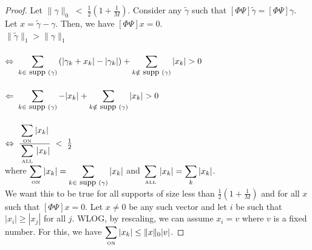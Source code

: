 \documentclass[12pt]{report}
\begin{document}
\begin{proof}
Let $\|\gamma\|_0 \; < \; \frac{1}{2}(1+\frac{1}{M})$. Consider any
$\widetilde{\gamma}$ such that $\left[ \Phi \Psi \right] \widetilde{\gamma} = \left[ \Phi \Psi \right] \gamma$.
Let $x = \widetilde{\gamma} - \gamma$. Then, we have $\left[ \Phi \Psi \right] x = 0$.\\

$\|\widetilde{\gamma}\|_1 > \|\gamma\|_1$ \\ \\
$\Leftrightarrow \; \displaystyle\sum_{k \in \mbox{\begin{small} supp \end{small}}(\gamma)} \left( |\gamma_k + x_k| -|\gamma_k| \right) + \displaystyle\sum_{k \notin \mbox{\begin{small} supp \end{small}}(\gamma)} |x_k| > 0$\\ \\
$\Leftarrow \; \displaystyle\sum_{k \in \mbox{\begin{small} supp \end{small}}(\gamma)} -|x_k| + \displaystyle\sum_{k \notin \mbox{\begin{small} supp \end{small}}(\gamma)} |x_k| > 0$\\ \\
$\Leftrightarrow \; \frac{\displaystyle\sum_{\mbox{\begin{tiny} ON \end{tiny}}}|x_k|}{\displaystyle\sum_{\mbox{\begin{tiny} ALL \end{tiny}}}|x_k|} \; < \; \frac{1}{2}$\\

\noindent where $\displaystyle\sum_{\mbox{\begin{tiny} ON \end{tiny}}}|x_k| = \displaystyle\sum_{k \in \mbox{\begin{small} supp \end{small}}(\gamma)}|x_k|$ and
$\displaystyle\sum_{\mbox{\begin{tiny} ALL \end{tiny}}}|x_k| = \displaystyle\sum_k |x_k|$.\\

\noindent We want this to be true for all supports of size less than $\frac{1}{2}(1+\frac{1}{M})$ and for all $x$
such that $\left[ \Phi \Psi \right] x = 0$. Let $x\neq 0$ be any such vector and let $i$ be such that
$|x_i| \geq |x_j|$ for all $j$. WLOG, by rescaling, we can assume $x_i=v$ where $v$ is a fixed number.
For this, we have $\displaystyle\sum_{\mbox{\begin{tiny} ON \end{tiny}}}|x_k| \leq \|x\|_0 |v|$.


\end{proof}
\end{document}
